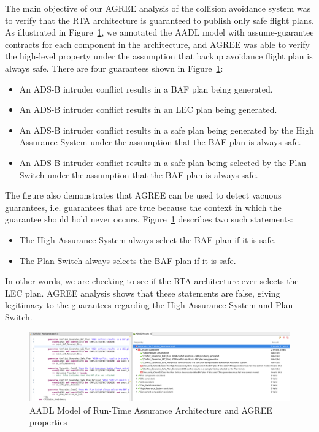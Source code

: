 The main objective of our AGREE analysis of the collision avoidance system was to verify that the RTA architecture is guaranteed to publish only safe flight plans.
%
As illustrated in Figure~\ref{fig:rta-agree}, we annotated the AADL model with assume-guarantee contracts for each component in the architecture, and AGREE was able to verify the high-level property under the assumption that backup avoidance flight plan is always safe.
There are four guarantees shown in Figure~\ref{fig:rta-agree}:
\begin{itemize}
\item An ADS-B intruder conflict results in a BAF plan being generated.
\item An ADS-B intruder conflict results in an LEC plan being generated.
\item An ADS-B intruder conflict results in a safe plan being generated by the High Assurance System under the assumption that the BAF plan is always safe.
\item An ADS-B intruder conflict results in a safe plan being selected by the Plan Switch under the assumption that the BAF plan is always safe.
\end{itemize}

The figure also demonstrates that AGREE can be used to detect vacuous guarantees, i.e. guarantees that are true because the context in which the guarantee should hold never occurs. Figure~\ref{fig:rta-agree} describes two such statements:
\begin{itemize}
\item The High Assurance System always select the BAF plan if it is safe.
\item The Plan Switch always selects the BAF plan if it is safe.
\end{itemize}
In other words, we are checking to see if the RTA architecture ever selects the LEC plan.  AGREE analysis shows that these statements are false, giving legitimacy to the guarantees regarding the High Assurance System and Plan Switch.

\begin{figure}
	\centering
	\includegraphics[width=\textwidth]{figures/rta-agree-v2.jpg}
	\caption{AADL Model of Run-Time Assurance Architecture and AGREE properties}
	\label{fig:rta-agree}
\end{figure}
